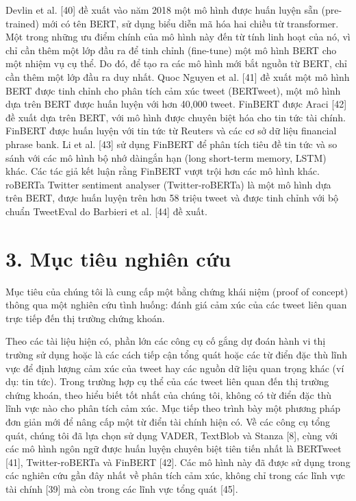 Devlin et al. [40] đề xuất vào năm 2018 một mô hình được huấn luyện sẵn (pre-trained) mới có tên BERT, sử dụng biểu diễn mã hóa hai chiều từ transformer. Một trong những ưu điểm chính của mô hình này đến từ tính linh hoạt của nó, vì chỉ cần thêm một lớp đầu ra để tinh chỉnh (fine-tune) một mô hình BERT cho một nhiệm vụ cụ thể. Do đó, để tạo ra các mô hình mới bắt nguồn từ BERT, chỉ cần thêm một lớp đầu ra duy nhất. Quoc Nguyen et al. [41] đề xuất một mô hình BERT được tinh chỉnh cho phân tích cảm xúc tweet (BERTweet), một mô hình dựa trên BERT được huấn luyện với hơn 40,000 tweet. FinBERT được Araci [42] đề xuất dựa trên BERT, với mô hình được chuyên biệt hóa cho tin tức tài chính. FinBERT được huấn luyện với tin tức từ Reuters và các cơ sở dữ liệu financial phrase bank. Li et al. [43] sử dụng FinBERT để phân tích tiêu đề tin tức và so sánh với các mô hình bộ nhớ dài\textendash ngắn hạn (long short-term memory, LSTM) khác. Các tác giả kết luận rằng FinBERT vượt trội hơn các mô hình khác. roBERTa Twitter sentiment analyser (Twitter-roBERTa) là một mô hình dựa trên BERT, được huấn luyện trên hơn 58 triệu tweet và được tinh chỉnh với bộ chuẩn TweetEval do Barbieri et al. [44] đề xuất.

\section{3. Mục tiêu nghiên cứu}

Mục tiêu của chúng tôi là cung cấp một bằng chứng khái niệm (proof of concept) thông qua một nghiên cứu tình huống: đánh giá cảm xúc của các tweet liên quan trực tiếp đến thị trường chứng khoán.

Theo các tài liệu hiện có, phần lớn các công cụ cố gắng dự đoán hành vi thị trường sử dụng hoặc là các cách tiếp cận tổng quát hoặc các từ điển đặc thù lĩnh vực để định lượng cảm xúc của tweet hay các nguồn dữ liệu quan trọng khác (ví dụ: tin tức). Trong trường hợp cụ thể của các tweet liên quan đến thị trường chứng khoán, theo hiểu biết tốt nhất của chúng tôi, không có từ điển đặc thù lĩnh vực nào cho phân tích cảm xúc. Mục tiếp theo trình bày một phương pháp đơn giản mới để nâng cấp một từ điển tài chính hiện có. Về các công cụ tổng quát, chúng tôi đã lựa chọn sử dụng VADER, TextBlob và Stanza [8], cùng với các mô hình ngôn ngữ được huấn luyện chuyên biệt tiên tiến nhất là BERTweet [41], Twitter-roBERTa và FinBERT [42]. Các mô hình này đã được sử dụng trong các nghiên cứu gần đây nhất về phân tích cảm xúc, không chỉ trong các lĩnh vực tài chính [39] mà còn trong các lĩnh vực tổng quát [45].

